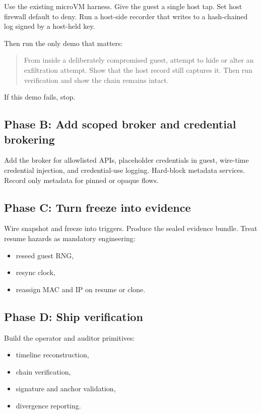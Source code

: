 \documentclass[11pt]{article}
\begin{document}
Use the existing microVM harness. Give the guest a single host tap. Set host firewall default to deny. Run a host-side recorder that writes to a hash-chained log signed by a host-held key.

Then run the only demo that matters:
\begin{quote}
From inside a deliberately compromised guest, attempt to hide or alter an exfiltration attempt. Show that the host record still captures it. Then run verification and show the chain remains intact.
\end{quote}

If this demo fails, stop.

\subsection{Phase B: Add scoped broker and credential brokering}

Add the broker for allowlisted APIs, placeholder credentials in guest, wire-time credential injection, and credential-use logging. Hard-block metadata services. Record only metadata for pinned or opaque flows.

\subsection{Phase C: Turn freeze into evidence}

Wire snapshot and freeze into triggers. Produce the sealed evidence bundle. Treat resume hazards as mandatory engineering:
\begin{itemize}[leftmargin=1.5em]
    \item reseed guest RNG,
    \item resync clock,
    \item reassign MAC and IP on resume or clone.
\end{itemize}

\subsection{Phase D: Ship verification}

Build the operator and auditor primitives:
\begin{itemize}[leftmargin=1.5em]
    \item timeline reconstruction,
    \item chain verification,
    \item signature and anchor validation,
    \item divergence reporting.
\end{itemize}
\end{document}
